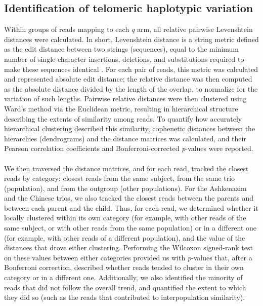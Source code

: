 \documentclass{article}
\begin{document}
\subsection*{Identification of telomeric haplotypic variation}
    Within groups of reads mapping to each \textit{q} arm, all relative pairwise Levenshtein distances were calculated.
    In short, Levenshtein distance is a string metric defined as the edit distance between two strings (sequences),
        equal to the minimum number of single-character insertions, deletions, and substitutions
            required to make these sequences identical \cite{levenshtein}.
    For each pair of reads, this metric was calculated and represented absolute edit distance;
        the relative distance was then computed as the absolute distance divided by the length of the overlap,
            to normalize for the variation of such lengths.
    Pairwise relative distances were then clustered using Ward's method via the Euclidean metric,
        resulting in hierarchical structure describing the extents of similarity among reads.
    To quantify how accurately hierarchical clustering described this similarity,
        cophenetic distances \cite{cophenetic} between the hierarchies (dendrograms) and the distance matrices was calculated,
        and their Pearson correlation coefficients and Bonferroni-corrected \textit{p}-values were reported.
    \\~\\
    We then traversed the distance matrices,
        and for each read, tracked the closest reads by category:
            closest reads from the same subject,
            from the same trio (population),
            and from the outgroup (other populations).
        For the Ashkenazim and the Chinese trios, we also tracked the closest reads
            between the parents
            and between each parent and the child.
        Thus, for each read, we determined whether it locally clustered
            within its own category
                (for example, with other reads of the same subject, or with other reads from the same population)
            or in a different one
                (for example, with other reads of a different population),
            and the value of the distances that drove either clustering.
        Performing the Wilcoxon signed-rank test on these values between either categories
            provided us with \textit{p}-values that, after a Bonferroni correction,
            described whether reads tended to cluster in their own category or in a different one.
        Additionally, we also identified the minority of reads that did not follow the overall trend,
            and quantified the extent to which they did so
                (such as the reads that contributed to interpopulation similarity).
\end{document}
